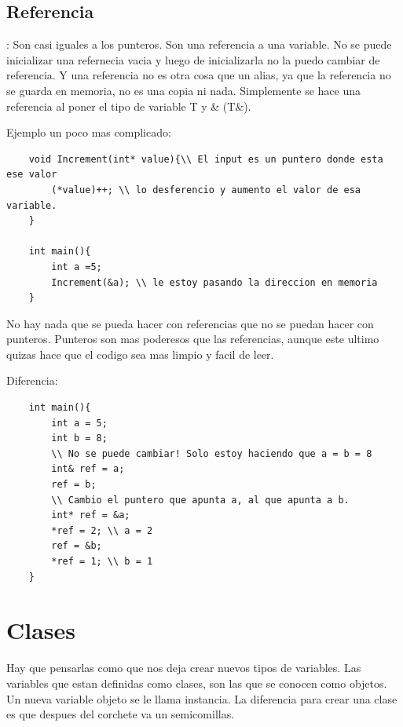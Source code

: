 \documentclass[11pt]{article}
\begin{document}
\subsection{Referencia}:
Son casi iguales a los punteros.
Son una referencia a una variable.
No se puede inicializar una refernecia vacia y luego de inicializarla no la puedo
cambiar de referencia.
Y una referencia no es otra cosa que un alias, ya que la referencia no se guarda
en memoria, no es una copia ni nada.
Simplemente se hace una referencia al poner el tipo de variable T y \& (T\&).

Ejemplo un poco mas complicado:
\begin{lstlisting}
    void Increment(int* value){\\ El input es un puntero donde esta ese valor
        (*value)++; \\ lo desferencio y aumento el valor de esa variable.
    }

    int main(){
        int a =5;
        Increment(&a); \\ le estoy pasando la direccion en memoria
    }
\end{lstlisting}

No hay nada que se pueda hacer con referencias que no se puedan hacer con punteros.
Punteros son mas poderesos que las referencias, aunque este ultimo quizas hace
que el codigo sea mas limpio y facil de leer.

Diferencia:
\begin{lstlisting}
    int main(){
        int a = 5;
        int b = 8;
        \\ No se puede cambiar! Solo estoy haciendo que a = b = 8
        int& ref = a;
        ref = b;
        \\ Cambio el puntero que apunta a, al que apunta a b.
        int* ref = &a;
        *ref = 2; \\ a = 2
        ref = &b;
        *ref = 1; \\ b = 1
    }
\end{lstlisting}

\section{Clases}
Hay que pensarlas como que nos deja crear nuevos tipos de variables.
Las variables que estan definidas como clases, son las que se conocen como objetos.
Un nueva variable objeto se le llama instancia.
La diferencia para crear una clase es que despues del corchete va un semicomillas.
\end{document}
